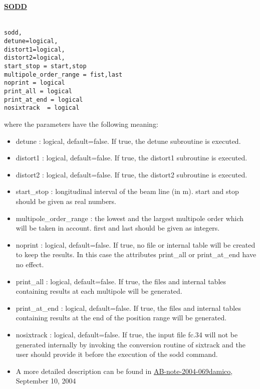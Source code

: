 \paragraph{\href{sodd}{SODD}}
\begin{verbatim}

sodd,
detune=logical,
distort1=logical,
distort2=logical,
start_stop = start,stop
multipole_order_range = fist,last
noprint = logical
print_all = logical
print_at_end = logical
nosixtrack  = logical
\end{verbatim} where the parameters have the following meaning: 
\begin{itemize}
	\item detune : logical, default=false. If true, the detune subroutine is executed. 
	\item distort1 : logical, default=false. If true, the distort1 subroutine is executed. 
	\item distort2 : logical, default=false. If true, the distort2 subroutine is executed. 
	\item start\_stop : longitudinal interval of the beam line (in m). start and stop should be given as real numbers. 
	\item multipole\_order\_range : the lowest and the largest multipole order which will be taken in account. first and last should be given as integers. 
	\item noprint : logical, default=false. If true, no file or internal table will be created to keep the results. In this case the attributes print\_all or print\_at\_end have no effect. 
	\item print\_all : logical, default=false. If true, the files and internal tables containing results at each multipole will be generated. 
	\item print\_at\_end : logical, default=false. If true, the files and internal tables containing results at the end of the position range will be generated. 
	\item nosixtrack  : logical, default=false. If true, the input file fc.34 will not be generated internally by invoking the conversion routine of sixtrack and the user should provide it before the execution of the sodd command. 

	\item A more detailed description can be found in  \href{http://cern.ch/madx/doc/ab-note-2004-069}{AB-note-2004-069}\href{http://xwho.web.cern.ch/xwho/people/show/6175}{damico}, September 10, 2004 
\end{itemize}

